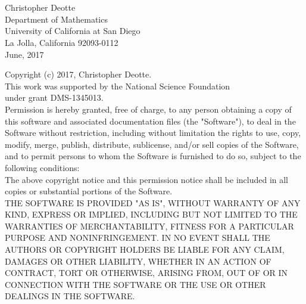 \documentclass{newsiambook}
\begin{document}
\setcounter{page}{1}

\begin{titlepage}
\begin{flushleft}
{}\\
{}
\vspace*{0.4cm}
{}\\
\vspace{0.6cm}
{\sffamily\LARGE{
Christopher Deotte\\}}
\vspace{0.2cm}
{\sffamily\Large{
Department of Mathematics \\
University of California at San Diego \\
La Jolla, California 92093-0112\\
\vspace{0.6cm}
June, 2017}\\
}
\end{flushleft}
\end{titlepage}
\newpage

\begin{flushleft}
\vspace*{3.0cm}
{\sffamily\large{
Copyright (c) 2017, Christopher Deotte.}}\\
\vspace{0.5cm}
{\sffamily\large{
This work was supported by the National Science Foundation \\
under grant DMS-1345013.}} \\
\vspace{1.0cm}
{\sffamily\normalsize{
  Permission is hereby granted, free of charge, to any person obtaining a copy
of this software and associated documentation files (the "Software"), to deal
in the Software without restriction, including without limitation the rights
to use, copy, modify, merge, publish, distribute, sublicense, and/or sell
copies of the Software, and to permit persons to whom the Software is
furnished to do so, subject to the following conditions:\\
\vspace{0.5cm}
The above copyright notice and this permission notice shall be included in all
copies or substantial portions of the Software.\\
\vspace{0.5cm}
THE SOFTWARE IS PROVIDED "AS IS", WITHOUT WARRANTY OF ANY KIND, EXPRESS OR
IMPLIED, INCLUDING BUT NOT LIMITED TO THE WARRANTIES OF MERCHANTABILITY,
FITNESS FOR A PARTICULAR PURPOSE AND NONINFRINGEMENT. IN NO EVENT SHALL THE
AUTHORS OR COPYRIGHT HOLDERS BE LIABLE FOR ANY CLAIM, DAMAGES OR OTHER
LIABILITY, WHETHER IN AN ACTION OF CONTRACT, TORT OR OTHERWISE, ARISING FROM,
OUT OF OR IN CONNECTION WITH THE SOFTWARE OR THE USE OR OTHER DEALINGS IN THE
SOFTWARE.}}\\
\end{flushleft}
\end{document}
